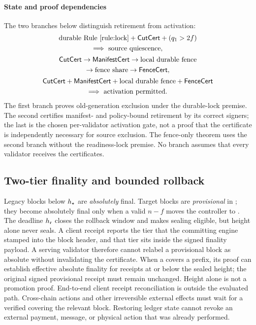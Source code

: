\paragraph{State and proof dependencies}
The two branches below distinguish retirement from activation:
\begin{equation}
\begin{gathered}
\text{durable Rule~\ref{rule:lock}}+\textsf{CutCert}+(q_1>2f)\\
\Longrightarrow\ \text{source quiescence},\\[0.3ex]
\textsf{CutCert}\to\textsf{ManifestCert}\to\text{local durable fence}\\
\to\text{fence share}\to\textsf{FenceCert},\\[0.3ex]
\textsf{CutCert}+\textsf{ManifestCert}+\text{local durable fence}+\textsf{FenceCert}\\
\Longrightarrow\ \text{activation permitted}.
\end{gathered}
\label{eq:dependencies}
\end{equation}
The first branch proves old-generation exclusion under the durable-lock premise. The second
certifies manifest- and policy-bound retirement by its correct signers; the last is the chosen
per-validator activation gate, not a proof that the certificate is independently necessary for
source exclusion. The fence-only theorem uses the second branch without the readiness-lock
premise. No branch assumes that every validator receives the certificates.

\subsection{Two-tier finality and bounded rollback}
Legacy blocks below $h_{\star}$ are \emph{absolutely} final. Target blocks are \emph{provisional} in
; they become absolutely final only when a valid $n-f$ \SealCert{} moves the controller to
. The deadline $h_{\mathrm r}$ closes the rollback window and makes sealing eligible, but height
alone never seals. A client receipt reports the tier that the committing engine stamped into the block
header, and that tier sits inside the signed finality payload. A serving validator therefore cannot
relabel a provisional block as absolute without invalidating the certificate. When a \SealCert{}
covers a prefix, its proof can establish effective absolute finality for receipts at or below the
sealed height; the original signed provisional receipt must remain unchanged. Height alone is not
a promotion proof. End-to-end client receipt reconciliation is outside the evaluated path.
Cross-chain actions and other irreversible external effects must wait for a verified \SealCert{}
covering the relevant block. Restoring ledger state cannot revoke an external payment, message, or
physical action that was already performed.

